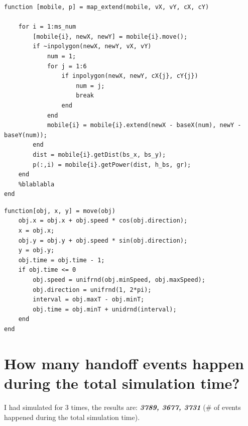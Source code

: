 \documentclass{article}
\begin{document}
\begin{lstlisting}[caption = {map\_extend.m}]
function [mobile, p] = map_extend(mobile, vX, vY, cX, cY)

    for i = 1:ms_num
        [mobile{i}, newX, newY] = mobile{i}.move();
        if ~inpolygon(newX, newY, vX, vY)
            num = 1;
            for j = 1:6
                if inpolygon(newX, newY, cX{j}, cY{j})
                    num = j;
                    break
                end
            end
            mobile{i} = mobile{i}.extend(newX - baseX(num), newY - baseY(num));
        end
        dist = mobile{i}.getDist(bs_x, bs_y);
        p(:,i) = mobile{i}.getPower(dist, h_bs, gr);
    end
    %blablabla
end
\end{lstlisting}

\begin{lstlisting}[caption = {rw\_mobile.m}]
function[obj, x, y] = move(obj)
    obj.x = obj.x + obj.speed * cos(obj.direction);
    x = obj.x;
    obj.y = obj.y + obj.speed * sin(obj.direction);
    y = obj.y;
    obj.time = obj.time - 1;
    if obj.time <= 0
        obj.speed = unifrnd(obj.minSpeed, obj.maxSpeed);
        obj.direction = unifrnd(1, 2*pi);
        interval = obj.maxT - obj.minT;
        obj.time = obj.minT + unidrnd(interval);
    end
end
\end{lstlisting}

\section{How many handoff events happen during the total simulation time?}
I had simulated for 3 times, the results are: \textbf{\textit{3789, 3677, 3731}} (\# of events happened during the total simulation time).
\end{document}
